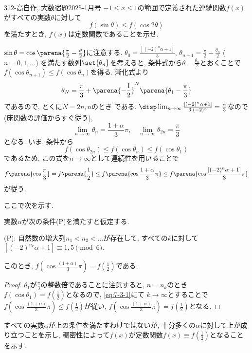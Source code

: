 \begin{thm}{312}{-高}{自作, 大数宿題2025-1月号}
$-1\leq x\leq 1$の範囲で定義された連続関数$f(x)$がすべての実数$\theta$に対して
\[ f(\sin{\theta}) \leq f(\cos{2\theta}) \]
を満たすとき, $f(x)$は定数関数であることを示せ. 
\end{thm}


 $\sin{\theta} = \cos{\parena{\frac{\pi}{2} - \frac{\theta}{2}}}$に注意する. $\theta_{0}=\frac{[(-2)^n \alpha +1]}{3}$, 
 $\theta_{n+1}=\frac{\pi}{2} - \frac{\theta_{n}}{2}$ ($n=0,1,\dots$) を満たす数列$\set{\theta_{n}}$を考えると, 条件式から$\theta = \frac{\theta_n}{2}$とおくことで $f(\cos{\theta_{n+1}})\leq f(\cos{\theta_{n}})$を得る. 
漸化式より
 \[\theta_{N} = \frac{\pi}{3} + \parena{-\frac{1}{2}}^{N}\parena{\theta_1 - \frac{\pi}{3}}\]
 であるので, とくに$N=2n,n$のとき
である. $\disp\lim_{n\to \infty} \frac{[(-2)^n\alpha + 1]}{3\cdot (-2)^n} = \frac{\alpha}{3}$なので(床関数の評価からすぐ従う), 
\[
\lim_{n\to \infty} \theta_n = \frac{1+\alpha}{3}\pi ,\quad \lim_{n\to\infty} \theta_{2n} = \frac{\pi}{3}
\]
となる. いま, 条件から
\begin{equation} \label{eq:7-3-1}
f(\cos{\theta_{2n}}) \leq f(\cos{\theta_n}) \leq f(\cos{\theta_1})
\end{equation}
であるため, この式を$n\to \infty$として連続性を用いることで
\[
f\parena{\cos{\frac{\pi}{3}}} = f\parena{\frac{1}{2}} \leq f\parena{\cos{\frac{1+\alpha}{3}\pi }} \leq f\parena{\cos{\frac{[(-2)^n\alpha + 1]}{3}\pi}}
\]
が従う. 


ここで次を示す. 
\begin{lem}\label{on_(P)_constant}
実数$\alpha$が次の条件(P)を満たすと仮定する. 
\begin{center}
(P): 自然数の増大列$n_1 < n_2 < \dots$が存在して, すべての$k$に対して $[(-2)^{n_k}\alpha + 1]\equiv 1,5\pmod{6}$.
\end{center}
このとき, $f(\cos{\frac{(1+\alpha)}{3}\pi}) = f(\frac{1}{2})$である. 
\end{lem}
\begin{proof}
$\theta_1$が$\frac{\pi}{3}$の整数倍であることに注意すると, $n=n_k$のとき $f(\cos{\theta_1}) = f(\frac{1}{2})$となるので, \cref{eq:7-3-1}にて $k\to \infty$とすることで$f(\cos{\frac{(1+\alpha)}{3}\pi}) \leq f(\frac{1}{2})$が従い, $f(\cos{\frac{(1+\alpha)}{3}\pi}) = f(\frac{1}{2})$となる.     
\end{proof}
すべての実数$\alpha$が上の条件を満たすわけではないが, 十分多くの$\alpha$に対して上が成り立つことを示し, 稠密性によって$f(x)$が定数関数$f(x) \equiv f(\frac{1}{2})$となることを示す. 

